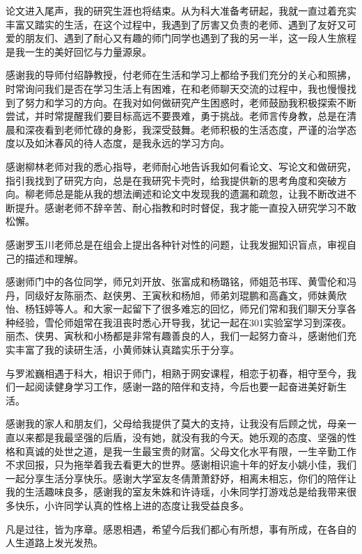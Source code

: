

\begin{ack}
论文进入尾声，我的研究生涯也将结束。从为科大准备考研起，我就一直过着充实丰富又踏实的生活，在这个过程中，我遇到了厉害又负责的老师、遇到了友好又可爱的朋友们、遇到了耐心又有趣的师门同学也遇到了我的另一半，这一段人生旅程是我一生的美好回忆与力量源泉。

感谢我的导师付绍静教授，付老师在生活和学习上都给予我们充分的关心和照拂，时常询问我们是否在学习生活上有困难，在和老师聊天交流的过程中，我也慢慢找到了努力和学习的方向。在我对如何做研究产生困惑时，老师鼓励我积极探索不断尝试，并时常提醒我们要目标高远不要畏难，勇于挑战。老师言传身教，总是在清晨和深夜看到老师忙碌的身影，我深受鼓舞。老师积极的生活态度，严谨的治学态度以及如沐春风的待人态度，是我永远的学习方向。

感谢柳林老师对我的悉心指导，老师耐心地告诉我如何看论文、写论文和做研究，指引我找到了研究方向，总是在我研究卡壳时，给我提供新的思考角度和突破方向。柳老师总是能从我的想法阐述和论文中发现我的遗漏和疏忽，让我不断改进不断提升。感谢老师不辞辛苦、耐心指教和时时督促，我才能一直投入研究学习不敢松懈。

感谢罗玉川老师总是在组会上提出各种针对性的问题，让我发掘知识盲点，审视自己的描述和理解。

感谢师门中的各位同学，师兄刘开放、张富成和杨璐铭，师姐范书珲、黄雪伦和冯丹，同级好友陈丽杰、赵侠男、王寅秋和杨旭，师弟刘琨鹏和高鑫文，师妹黄欣怡、杨钰婷等人。和大家一起留下了很多难忘的回忆，师兄们常和我们聊天分享各种经验，雪伦师姐常在我沮丧时悉心开导我，犹记一起在301实验室学习到深夜。丽杰、侠男、寅秋和小杨都是非常有趣善良的人，我们一起努力奋斗，感谢他们充实丰富了我的读研生活，小黄师妹认真踏实乐于分享。

与罗淞巍相遇于科大，相识于师门，相熟于网安课程，相恋于初春，相守至今，我们一起阅读健身学习工作，感谢一路的陪伴和支持，今后也要一起奋进美好新生活。

感谢我的家人和朋友们，父母给我提供了莫大的支持，让我没有后顾之忧，母亲一直以来都是我最坚强的后盾，没有她，就没有我的今天。她乐观的态度、坚强的性格和真诚的处世之道，是我一生最宝贵的财富。父母文化水平有限，一生辛勤工作不求回报，只为拖举着我去看更大的世界。感谢相识逾十年的好友小姚小佳，我们一起分享生活分享快乐。感谢大学室友冬倩萧萧舒妤，相离未相忘，你们的陪伴让我的生活趣味良多，感谢我的室友朱姝和许诗瑶，小朱同学打游戏总是给我带来很多快乐，小许同学认真的性格上进的态度让我受益良多。

凡是过往，皆为序章。感恩相遇，希望今后我们都心有所想，事有所成，在各自的人生道路上发光发热。

\end{ack}
